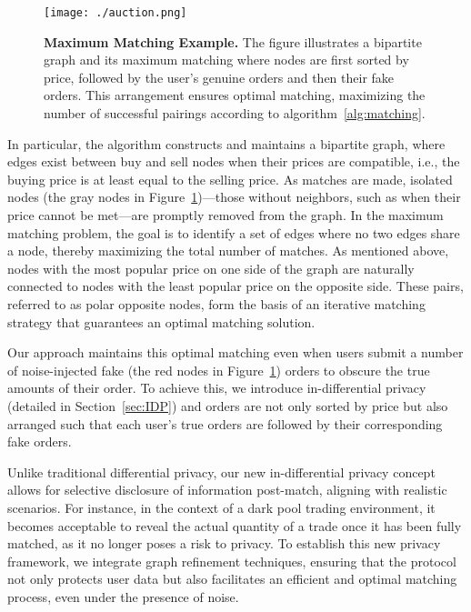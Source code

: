 \begin{figure}[hbt!]
    \centering
    \texttt{[image: ./auction.png]}  %
    \caption{\textbf{Maximum Matching Example.} \textnormal{The figure illustrates a bipartite graph and its maximum matching where nodes are first sorted by price, followed by the user's genuine orders and then their fake orders. This arrangement ensures optimal matching, maximizing the number of successful pairings according to algorithm~\ref{alg:matching}.}}
    \label{fig:auction}
\end{figure}





In particular, the algorithm constructs and maintains a bipartite graph, where edges exist between buy and sell nodes when their prices are compatible, i.e., the buying price is at least equal to the selling price. As matches are made, isolated nodes (the gray nodes in Figure~\ref{fig:auction})—those without neighbors, such as when their price cannot be met—are promptly removed from the graph. 
In the maximum matching problem, the goal is to identify a set of edges where no two edges share a node, thereby maximizing the total number of matches. As mentioned above, nodes with the most popular price on one side of the graph are naturally connected to nodes with the least popular price on the opposite side. These pairs, referred to as polar opposite nodes, form the basis of an iterative matching strategy that guarantees an optimal matching solution.

Our approach maintains this optimal matching even when users submit a number of noise-injected fake (the red nodes in Figure~\ref{fig:auction}) orders to obscure the true amounts of their order. To achieve this, we introduce  in-differential privacy (detailed in Section~\ref{sec:IDP}) and orders are not only sorted by price but also arranged such that each user’s true orders are followed by their corresponding fake orders. 

Unlike traditional differential privacy, our new in-differential privacy concept allows for selective disclosure of information post-match, aligning with realistic scenarios. For instance, in the context of a dark pool trading environment, it becomes acceptable to reveal the actual quantity of a trade once it has been fully matched, as it no longer poses a risk to privacy.
To establish this new privacy framework, we integrate graph refinement techniques, ensuring that the protocol not only protects user data but also facilitates an efficient and optimal matching process, even under the presence of noise.

